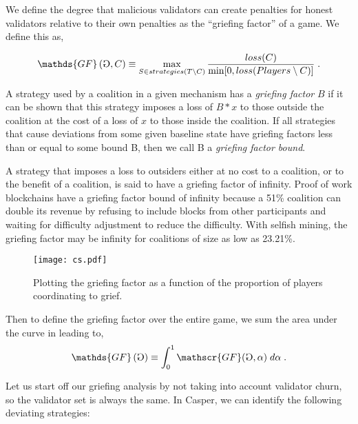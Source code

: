 \documentclass[12pt, final]{article}
\newcommand{\gamesymbol}{ \reflectbox{G} }
\newcommand{\GF}[1]{\mathds{GF}\left( #1 \right)\xspace}
\begin{document}
We define the degree that malicious validators can create penalties for honest validators relative to their own penalties as the ``griefing factor'' of a game.  We define this as,

\begin{equation}
\GF{ \gamesymbol,C } \equiv \max_{S \in strategies(T \setminus C)} \frac{loss(C) }{\min[ 0, loss(Players \setminus C) ] } \; .
\end{equation}





\begin{definition}
A strategy used by a coalition in a given mechanism has a \emph{griefing factor} $B$ if it can be shown that this strategy imposes a loss of $B * x$ to those outside the coalition at the cost of a loss of $x$ to those inside the coalition. If all strategies that cause deviations from some given baseline state have griefing factors less than or equal to some bound B, then we call B a \emph{griefing factor bound}. 
\end{definition}

A strategy that imposes a loss to outsiders either at no cost to a coalition, or to the benefit of a coalition, is said to have a griefing factor of infinity. Proof of work blockchains have a griefing factor bound of infinity because a 51\% coalition can double its revenue by refusing to include blocks from other participants and waiting for difficulty adjustment to reduce the difficulty. With selfish mining, the griefing factor may be infinity for coalitions of size as low as 23.21\%. \cite{selfishminingBTC}



\begin{figure}[h!bt]
	\centering
	\texttt{[image: cs.pdf]}
	\caption{Plotting the griefing factor as a function of the proportion of players coordinating to grief.}
	\label{fig:GF}
\end{figure}

Then to define the griefing factor over the entire game, we sum the area under the curve in  leading to,
\begin{equation}
\GF{ \gamesymbol } \equiv \int_{0}^{1} \mathscr{GF}( \gamesymbol, \alpha ) \; d\alpha \; .
\end{equation}


Let us start off our griefing analysis by not taking into account validator churn, so the validator set is always the same. In Casper, we can identify the following deviating strategies:
\end{document}

